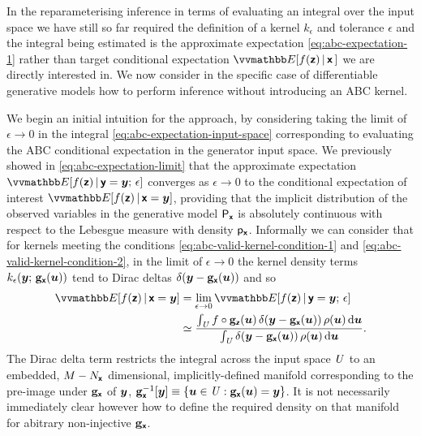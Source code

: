 In the reparameterising inference in terms of evaluating an integral over the input space we have still so far required the definition of a kernel $k_\epsilon$ and tolerance $\epsilon$ and the integral being estimated is the approximate expectation \eqref{eq:abc-expectation-1} rather than target conditional expectation $\expc{f(\rvct{z}) \gvn \rvct{x}\,}$ we are directly interested in. We now consider in the specific case of differentiable generative models how to perform inference without introducing an \ac{ABC} kernel.

We begin an initial intuition for the approach, by considering taking the limit of $\epsilon \to 0$ in the integral \eqref{eq:abc-expectation-input-space} corresponding to evaluating the \ac{ABC} conditional expectation in the generator input space. We previously showed in \eqref{eq:abc-expectation-limit} that the approximate expectation $\expc{f(\rvct{z}) \gvn \rvct{y}= \vct{y};\,\epsilon}$ converges as $\epsilon \to 0$ to the conditional expectation of interest $\expc{f(\rvct{z}) \gvn \rvct{x} = \vct{y}}$, providing that the implicit distribution of the observed variables in the generative model $\mathsf{P}_{\boldsymbol{\mathsf{x}}}$ is absolutely continuous with respect to the Lebesgue measure with density $\mathsf{p}_{\boldsymbol{\mathsf{x}}}$. Informally we can consider that for kernels meeting the conditions \eqref{eq:abc-valid-kernel-condition-1} and \eqref{eq:abc-valid-kernel-condition-2}, in the limit of $\epsilon \to 0$ the kernel density terms $k_\epsilon\lpa{\vct{y}};\,\genfunc_{\rvct{x}}(\vct{u})\rpa$ tend to Dirac deltas ${\delta}\lpa\vct{y} - \genfunc_{\rvct{x}}(\vct{u})\rpa$ and so
\begin{align}\label{eq:expectation-input-space-limit}
  \expc{f(\rvct{z}) \gvn \rvct{x}=\vct{y}} &=
  \lim_{\epsilon\to 0}  \expc{f(\rvct{z}) \gvn \rvct{y}=\vct{y};\,\epsilon} 
  \\
  &\simeq
  \frac{
  \int_{\set{U}} 
    f\circ\genfunc_{\rvct{z}}(\vct{u}) \,
    \delta\lpa\vct{y} - \genfunc_{\rvct{x}}(\vct{u})\rpa\,
    \rho(\vct{u})
  \,\dr\vct{u}
  }
  {
    \int_{\set{U}} 
    \delta\lpa\vct{y} - \genfunc_{\rvct{x}}(\vct{u})\rpa\,
    \rho(\vct{u})
  \,\dr\vct{u}
  }.
\end{align}
The Dirac delta term restricts the integral across the input space $\mathit{U}$ to an embedded, $M - N_{\boldsymbol{\mathsf{x}}}$ dimensional, implicitly-defined manifold corresponding to the pre-image under ${\mathbf{g}}_{\boldsymbol{\mathsf{x}}}$ of $\boldsymbol{y}$, $\preimage{\genfunc_{\rvct{x}}}{\vct{y}} \equiv \fset{\vct{u} \in \set{U} :  \genfunc_{\rvct{x}}(\vct{u}) = \vct{y}}$. It is not necessarily immediately clear however how to define the required density on that manifold for abitrary non-injective ${\mathbf{g}}_{\boldsymbol{\mathsf{x}}}$.

